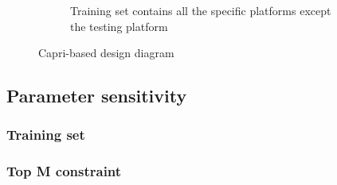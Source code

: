 \begin{figure}[tbhp]
\begin{subfigure}[b]{1.0\linewidth}
      \caption{Training set contains all the specific platforms except the testing platform}
      \label{fig:specific_perf}
    \end{subfigure}
  \caption{Capri-based \atl design diagram}
  \end{figure}

  \subsection{Parameter sensitivity}
  \label{sec:parametersensitivity}

    \subsubsection{Training set}
    \label{sec:training_set}

    \subsubsection{Top M constraint}
    \label{sec:top_m}
